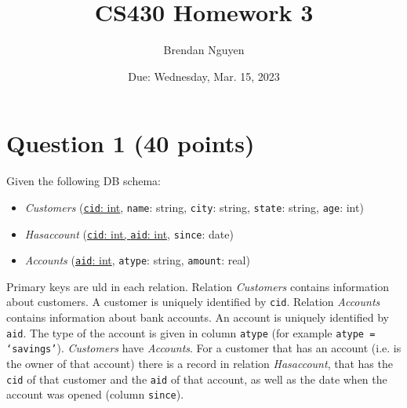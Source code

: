 \documentclass[letterpaper, 11pt]{article}
\title{CS430 Homework 3}
\author{Brendan Nguyen}
\date{Due: Wednesday, Mar. 15, 2023}
\begin{document}
\maketitle

\section*{Question 1 (40 points)}

Given the following DB schema:
\begin{itemize}
    \item \textit{Customers} (\ul{\texttt{cid}: int}, \texttt{name}: string, \texttt{city}: string, \texttt{state}: string, \texttt{age}: int)
    \item \textit{Has\textunderscore account} (\ul{\texttt{cid}: int, \texttt{aid}: int}, \texttt{since}: date)
    \item \textit{Accounts} (\ul{\texttt{aid}: int}, \texttt{atype}: string, \texttt{amount}: real)
\end{itemize}

Primary keys are uld in each relation. Relation \textit{Customers} contains information about customers. A customer is uniquely identified by \texttt{cid}. Relation \textit{Accounts} contains information about bank accounts. An account is uniquely identified by \texttt{aid}. The type of the account is given in column \texttt{atype} (for example  \texttt{atype = `savings'}).  \textit{Customers} have \textit{Accounts}. For a customer that has an account (i.e. is the owner of that account) there is a record in relation \textit{Has\textunderscore account}, that has the \texttt{cid} of that customer and the \texttt{aid} of that account, as well as the date when the account was opened (column \texttt{since}).
\end{document}
